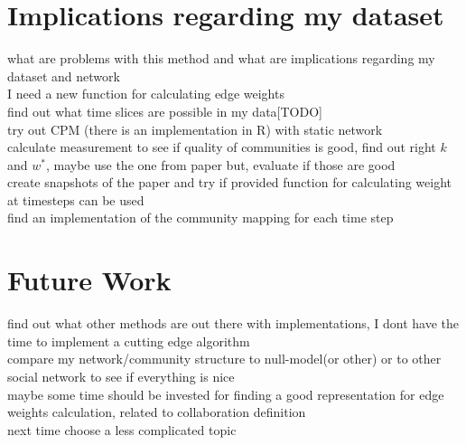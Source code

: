 \documentclass[runningheads,a4paper]{llncs}
\begin{document}
\section{Implications regarding my dataset}
what are problems with this method and what are implications regarding my dataset and network\\
I need a new function for calculating edge weights\\
find out what time slices are possible in my data[TODO]\\
try out CPM (there is an implementation in R) with static network\\
calculate measurement to see if quality of communities is good, find out right $k$ and $w^*$, maybe use the one from paper but, evaluate if those are good\\
create snapshots of the paper and try if provided function for calculating weight at timesteps can be used\\
find an implementation of the community mapping for each time step\\

\section{Future Work}
find out what other methods are out there with implementations, I dont have the time to implement a cutting edge algorithm\\
compare my network/community structure to null-model(or other) or to other social network to see if everything is nice\\
maybe some time should be invested for finding a good representation for edge weights calculation, related to collaboration definition\\
next time choose a less complicated topic\\

{
	
	
}
\end{document}
